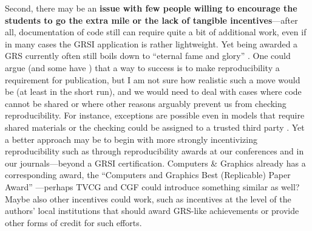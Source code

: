 \documentclass[conference]{vgtc}                     %
\begin{document}
Second, there may be an \textbf{issue with few people willing to encourage the students to go the extra mile or the lack of tangible incentives}---after all, documentation of code still can require quite a bit of additional work, even if in many cases the GRSI application is rather lightweight. Yet being awarded a GRS currently often still boils down to ``eternal fame and glory'' \cite{Isenberg:2022:PEP}. One could argue (and some have \cite{Haroz:2018:OPV}) that a way to success is to make reproducibility a requirement for publication, but I am not sure how realistic such a move would be (at least in the short run), and we would need to deal with cases where code cannot be shared or where other reasons arguably prevent us from checking reproducibility. For instance, exceptions are possible even in models that require shared materials \cite{Haroz:2018:OPV} or the checking could be assigned to a trusted third party \cite{Besancon:2021:OSS}. Yet a better approach may be to begin with more strongly incentivizing reproducibility such as through reproducibility awards at our conferences and in our journals---beyond a GRSI certification. Computers \& Graphics already has a corresponding award, the ``Computers and Graphics Best (Replicable) Paper Award'' \cite{Jorge:2020:NEC}---perhaps TVCG and CGF could introduce something similar as well? Maybe also other incentives could work, such as incentives at the level of the authors' local institutions that should award GRS-like achievements or provide other forms of credit for such efforts.
\end{document}
